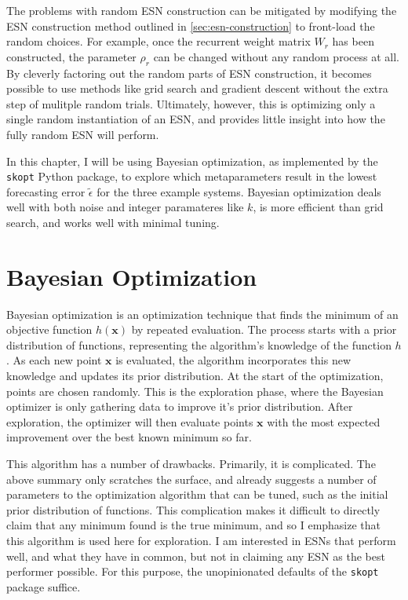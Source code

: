 The problems with random ESN construction can be mitigated by
modifying the ESN construction method outlined in
\cref{sec:esn-construction} to front-load the random choices. For
example, once the recurrent weight matrix $W_r$ has been constructed,
the parameter $\rho_r$ can be changed without any random process at
all. By cleverly factoring out the random parts of ESN construction,
it becomes possible to use methods like grid search and gradient
descent without the extra step of mulitple random trials. Ultimately,
however, this is optimizing only a single random instantiation of an
ESN, and provides little insight into how the fully random ESN will
perform.

In this chapter, I will be using Bayesian
optimization\cite{yperman2016,maat2018}, as implemented by the
\texttt{skopt} Python package\cite{skopt2018}, to explore which
metaparameters result in the lowest forecasting error
$\tilde{\epsilon}$ for the three example systems. Bayesian
optimization deals well with both noise and integer paramateres like
$k$, is more efficient than grid search,\cite{maat2018} and works well
with minimal tuning.

\section{Bayesian Optimization}

Bayesian optimization is an optimization technique that finds the
minimum of an objective function $h(\bm{x})$ by repeated
evaluation. The process starts with a prior distribution of functions,
representing the algorithm's knowledge of the function $h$. As each
new point $\bm{x}$ is evaluated, the algorithm incorporates this new knowledge
and updates its prior distribution. At the start of the optimization,
points are chosen randomly. This is the exploration phase, where the
Bayesian optimizer is only gathering data to improve it's prior
distribution. After exploration, the optimizer will then evaluate
points $\bm{x}$ with the most expected improvement over the best known minimum
so far.

This algorithm has a number of drawbacks. Primarily, it is
complicated. The above summary only scratches the surface, and already
suggests a number of parameters to the optimization algorithm that can
be tuned, such as the initial prior distribution of functions. This
complication makes it difficult to directly claim that any minimum
found is the true minimum, and so I emphasize that this algorithm is
used here for exploration. I am interested in ESNs that perform well,
and what they have in common, but not in claiming any ESN as the best
performer possible. For this purpose, the unopinionated defaults of
the \texttt{skopt} package suffice.

